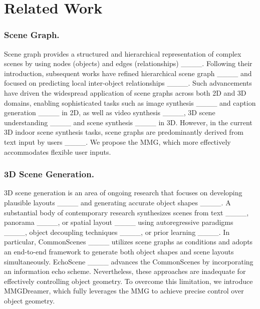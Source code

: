 \section{Related Work}
\subsubsection{Scene Graph.}
Scene graph provides a structured and hierarchical representation of complex scenes by using nodes (objects) and edges (relationships) ____. 
Following their introduction, subsequent works have refined hierarchical scene graph ____ and focused on predicting local inter-object relationships ____.
Such advancements have driven the widespread application of scene graphs across both 2D and 3D domains, enabling sophisticated tasks such as image synthesis ____ and caption generation ____ in 2D, as well as video synthesis ____, 3D scene understanding ____ and scene synthesis ____ in 3D. 
However, in the current 3D indoor scene synthesis tasks, scene graphs are predominantly derived from text input by users ____. We propose the MMG, which more effectively accommodates flexible user inputs.

\subsubsection{3D Scene Generation.}
3D scene generation is an area of ongoing research that focuses on developing plausible layouts ____ and generating accurate object shapes ____.
A substantial body of contemporary research synthesizes scenes from text ____, panorama ____, or spatial layout ____ using autoregressive paradigms ____, object decoupling techniques ____, or prior learning ____.
In particular, CommonScenes ____ utilizes scene graphs as conditions and adopts an end-to-end framework to generate both object shapes and scene layouts simultaneously. 
EchoScene ____ advances the CommonScenes by incorporating an information echo scheme.
Nevertheless, these approaches are inadequate for effectively controlling object geometry. To overcome this limitation, we introduce MMGDreamer, which fully leverages the MMG to achieve precise control over object geometry.

